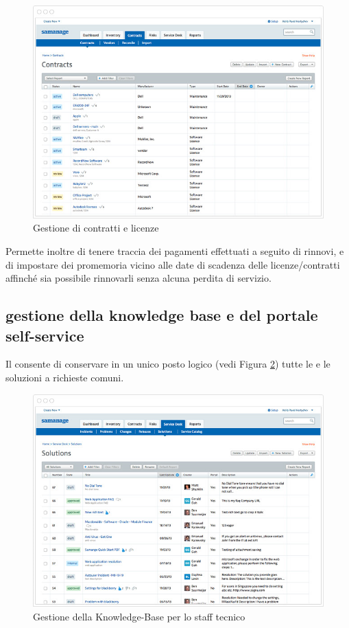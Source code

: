 \begin{figure}[htbp]
\centering
\includegraphics[scale=0.6]{Images/samanage/Contract_license.png}
\caption{Gestione di contratti e licenze}
\label{sd-tools-contract-img}
\end{figure}

Permette inoltre di tenere traccia dei pagamenti effettuati a seguito di rinnovi, e di impostare dei promemoria vicino alle date di scadenza delle licenze/contratti affinché sia possibile rinnovarli senza alcuna perdita di servizio.

\subsection[Gestione della Knowledge Base e del portale self-service]{gestione della knowledge base e del portale self-service}
\label{sd-tools-knowledge-base}
Il  consente di conservare in un unico posto logico (vedi Figura \ref{sd-tools-knowledge-base-img-1}) tutte le  e le soluzioni a richieste comuni.

\begin{figure}[htbp]
\centering
\includegraphics[scale=0.6]{Images/samanage/Knowledge_base.png}
\caption{Gestione della \ac{Knowledge-Base} per lo staff tecnico}
\label{sd-tools-knowledge-base-img-1}
\end{figure}

